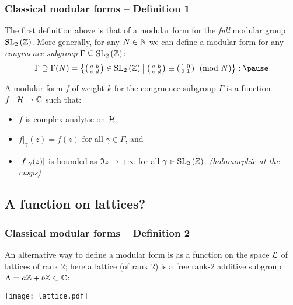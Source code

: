 \begin{frame} \frametitle{Classical modular forms -- Definition 1}
  The first definition above is that of a modular form for the \emph{full} modular group $\SL[2]{\ZZ}$.
  More generally, for any $N \in \NN$ we can define a modular form for any \emph{congruence subgroup} $\Gamma \subseteq \SL[2]{\ZZ}$:
  \[ \Gamma \supseteq \Gamma(N) = \setst{\parens{\begin{smallmatrix} a & b \\ c & d \end{smallmatrix}} \in \SL[2]{\ZZ}}{\parens{\begin{smallmatrix} a & b \\ c & d \end{smallmatrix}} \equiv \parens{\begin{smallmatrix} 1 & 0 \\ 0 & 1 \end{smallmatrix}} \pmod{N}}: \pause \]
  \begin{definition}
    A modular form $f$ of weight $k$ for the congruence subgroup $\Gamma$ is a function $f : \HH \to \CC$ such that: \pause
    \begin{itemize}
      \item $f$ is complex analytic on $\HH$\pause,
      \item $f|_\gamma(z) = f(z)$ for all $\gamma \in \Gamma$\pause, and
      \item $\abs{f|_\gamma(z)}$ is bounded as $\Im{z} \to +\infty$ for all $\gamma \in \SL[2]{\ZZ}$. \pause \hfill \emph{(holomorphic at the cusps)}
    \end{itemize}
  \end{definition} \pause

\end{frame}


\subsection{A function on lattices?}

\begin{frame} \frametitle{Classical modular forms -- Definition 2}
  An alternative way to define a modular form is as a function on the space $\LL$ of lattices of rank $2$\pause; here a lattice (of rank $2$) is a free rank-$2$ additive subgroup $\Lambda = a\ZZ +b\ZZ \subset \CC$:\pause

  \texttt{[image: lattice.pdf]}
\end{frame}


